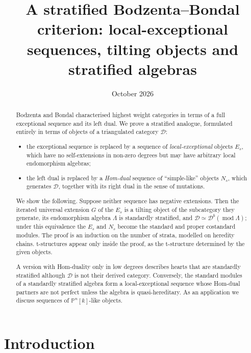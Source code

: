 \documentclass[11pt,reqno]{amsart}
\title[Local-exceptional sequences and stratified algebras]{A stratified Bodzenta--Bondal criterion: local-exceptional sequences, tilting objects and stratified algebras}
\date{October 2026}
\theoremstyle{plain}
\theoremstyle{definition}
\theoremstyle{remark}
\newcommand{\modd}{\operatorname{mod}}
\newcommand{\Db}{\mathcal{D}^b}
\newcommand{\Pn}[2]{\mathbb{P}^{#1}[#2]}
\newcommand{\cD}{\mathcal{D}}
\begin{document}
\begin{abstract}
Bodzenta and Bondal characterised highest weight categories in terms of a full exceptional sequence and its left dual. We prove a stratified analogue, formulated entirely in terms of objects of a triangulated category $\cD$:
\begin{itemize}
\item the exceptional sequence is replaced by a sequence of \emph{local-exceptional} objects $E_s$, which have no self-extensions in non-zero degrees but may have arbitrary local endomorphism algebras;
\item the left dual is replaced by a \emph{Hom-dual} sequence of ``simple-like'' objects $N_s$, which generates $\cD$, together with its right dual in the sense of mutations.
\end{itemize}
We show the following. Suppose neither sequence has negative extensions. Then the iterated universal extension $G$ of the $E_s$ is a tilting object of the subcategory they generate, its endomorphism algebra $\Lambda$ is standardly stratified, and $\cD\simeq\Db(\modd\Lambda)$; under this equivalence the $E_s$ and $N_s$ become the standard and proper costandard modules. The proof is an induction on the number of strata, modelled on heredity chains. t-structures appear only inside the proof, as the t-structure determined by the given objects.

A version with Hom-duality only in low degrees describes hearts that are standardly stratified although $\cD$ is not their derived category. Conversely, the standard modules of a standardly stratified algebra form a local-exceptional sequence whose Hom-dual partners are not perfect unless the algebra is quasi-hereditary. As an application we discuss sequences of $\Pn nk$-like objects.
\end{abstract}

\maketitle

\setcounter{tocdepth}{1}
\tableofcontents

\section{Introduction}
\end{document}
